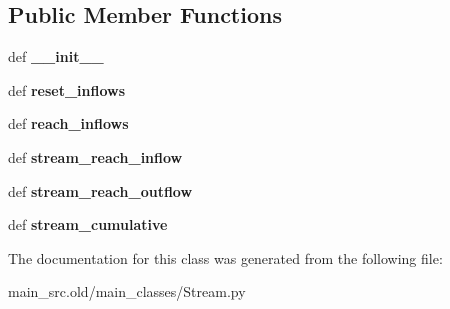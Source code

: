 \subsection*{Public Member Functions}
\begin{DoxyCompactItemize}
\item 
\hypertarget{classmain__src_8old_1_1main__classes_1_1Stream_1_1StreamPass_a642381ee219a48cace145d4137408bda}{def {\bfseries \-\_\-\-\_\-init\-\_\-\-\_\-}}\label{classmain__src_8old_1_1main__classes_1_1Stream_1_1StreamPass_a642381ee219a48cace145d4137408bda}

\item 
\hypertarget{classmain__src_8old_1_1main__classes_1_1Stream_1_1StreamPass_a47243294c33d2d314a9d06e537ae0be6}{def {\bfseries reset\-\_\-inflows}}\label{classmain__src_8old_1_1main__classes_1_1Stream_1_1StreamPass_a47243294c33d2d314a9d06e537ae0be6}

\item 
\hypertarget{classmain__src_8old_1_1main__classes_1_1Stream_1_1StreamPass_ac4ba90cb006cef54853a606104549e42}{def {\bfseries reach\-\_\-inflows}}\label{classmain__src_8old_1_1main__classes_1_1Stream_1_1StreamPass_ac4ba90cb006cef54853a606104549e42}

\item 
\hypertarget{classmain__src_8old_1_1main__classes_1_1Stream_1_1StreamPass_a3967e3193731883a6c02db3a7e665966}{def {\bfseries stream\-\_\-reach\-\_\-inflow}}\label{classmain__src_8old_1_1main__classes_1_1Stream_1_1StreamPass_a3967e3193731883a6c02db3a7e665966}

\item 
\hypertarget{classmain__src_8old_1_1main__classes_1_1Stream_1_1StreamPass_ac9e4183e8e3065af0b5729b284841c6c}{def {\bfseries stream\-\_\-reach\-\_\-outflow}}\label{classmain__src_8old_1_1main__classes_1_1Stream_1_1StreamPass_ac9e4183e8e3065af0b5729b284841c6c}

\item 
\hypertarget{classmain__src_8old_1_1main__classes_1_1Stream_1_1StreamPass_a66891996a02eecb65aada5579fbb89cc}{def {\bfseries stream\-\_\-cumulative}}\label{classmain__src_8old_1_1main__classes_1_1Stream_1_1StreamPass_a66891996a02eecb65aada5579fbb89cc}

\end{DoxyCompactItemize}


The documentation for this class was generated from the following file\-:\begin{DoxyCompactItemize}
\item 
main\-\_\-src.\-old/main\-\_\-classes/Stream.\-py\end{DoxyCompactItemize}
